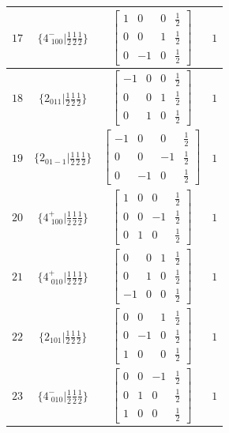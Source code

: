 \documentclass[fleqn,8pt]{jsarticle}
\begin{document}
\begin{longtable}{cccc}
$ 17 $ & $ \{4^{-}_{\,\,100}|\frac{1}{2} \frac{1}{2} \frac{1}{2}\} $ & $ \begin{bmatrix} 1 & 0 & 0 & \frac{1}{2} \\ 0 & 0 & 1 & \frac{1}{2} \\ 0 & -1 & 0 & \frac{1}{2} \end{bmatrix} $ & $ 1 $ \\ \hline
$ 18 $ & $ \{2{}_{011}|\frac{1}{2} \frac{1}{2} \frac{1}{2}\} $ & $ \begin{bmatrix} -1 & 0 & 0 & \frac{1}{2} \\ 0 & 0 & 1 & \frac{1}{2} \\ 0 & 1 & 0 & \frac{1}{2} \end{bmatrix} $ & $ 1 $ \\ \hline
$ 19 $ & $ \{2{}_{01-1}|\frac{1}{2} \frac{1}{2} \frac{1}{2}\} $ & $ \begin{bmatrix} -1 & 0 & 0 & \frac{1}{2} \\ 0 & 0 & -1 & \frac{1}{2} \\ 0 & -1 & 0 & \frac{1}{2} \end{bmatrix} $ & $ 1 $ \\ \hline
$ 20 $ & $ \{4^{+}_{\,\,100}|\frac{1}{2} \frac{1}{2} \frac{1}{2}\} $ & $ \begin{bmatrix} 1 & 0 & 0 & \frac{1}{2} \\ 0 & 0 & -1 & \frac{1}{2} \\ 0 & 1 & 0 & \frac{1}{2} \end{bmatrix} $ & $ 1 $ \\ \hline
$ 21 $ & $ \{4^{+}_{\,\,010}|\frac{1}{2} \frac{1}{2} \frac{1}{2}\} $ & $ \begin{bmatrix} 0 & 0 & 1 & \frac{1}{2} \\ 0 & 1 & 0 & \frac{1}{2} \\ -1 & 0 & 0 & \frac{1}{2} \end{bmatrix} $ & $ 1 $ \\ \hline
$ 22 $ & $ \{2{}_{101}|\frac{1}{2} \frac{1}{2} \frac{1}{2}\} $ & $ \begin{bmatrix} 0 & 0 & 1 & \frac{1}{2} \\ 0 & -1 & 0 & \frac{1}{2} \\ 1 & 0 & 0 & \frac{1}{2} \end{bmatrix} $ & $ 1 $ \\ \hline
$ 23 $ & $ \{4^{-}_{\,\,010}|\frac{1}{2} \frac{1}{2} \frac{1}{2}\} $ & $ \begin{bmatrix} 0 & 0 & -1 & \frac{1}{2} \\ 0 & 1 & 0 & \frac{1}{2} \\ 1 & 0 & 0 & \frac{1}{2} \end{bmatrix} $ & $ 1 $ \\ \hline

\end{longtable}
\end{document}
